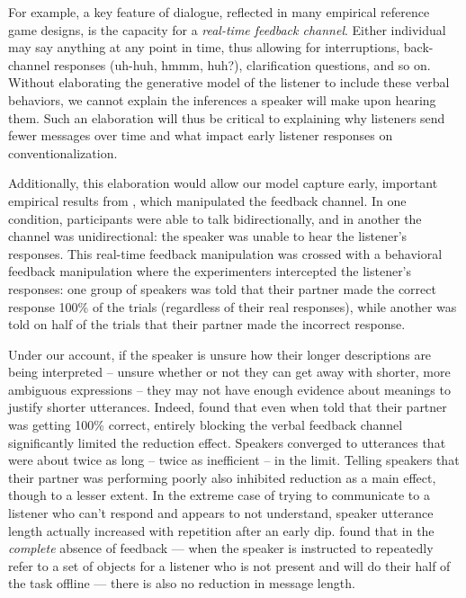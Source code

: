 For example, a key feature of dialogue, reflected in many empirical reference game designs, is the capacity for a \emph{real-time feedback channel}.
Either individual may say anything at any point in time, thus allowing for interruptions, back-channel responses (uh-huh, hmmm, huh?), clarification questions, and so on. 
Without elaborating the generative model of the listener to include these verbal behaviors, we cannot explain the inferences a speaker will make upon hearing them.
Such an elaboration will thus be critical to explaining why listeners send fewer messages over time and what impact early listener responses on conventionalization. 

Additionally, this elaboration would allow our model capture early, important empirical results from , which manipulated the feedback channel.
In one condition, participants were able to talk bidirectionally, and in another the channel was unidirectional: the speaker was unable to hear the listener's responses. 
This real-time feedback manipulation was crossed with a behavioral feedback manipulation where the experimenters intercepted the listener's responses: one group of speakers was told that their partner made the correct response 100\% of the trials (regardless of their real responses), while another was told on half of the trials that their partner made the incorrect response. 

Under our account, if the speaker is unsure how their longer descriptions are being interpreted -- unsure whether or not they can get away with shorter, more ambiguous expressions -- they may not have enough evidence about meanings to justify shorter utterances. 
Indeed,  found that even when told that their partner was getting 100\% correct, entirely blocking the verbal feedback channel significantly limited the reduction effect. 
Speakers converged to utterances that were about twice as long -- twice as inefficient -- in the limit. 
Telling speakers that their partner was performing poorly also inhibited reduction as a main effect, though to a lesser extent. 
In the extreme case of trying to communicate to a listener who can't respond and appears to not understand, speaker utterance length actually increased with repetition after an early dip. 
 found that in the \emph{complete} absence of feedback --- when the speaker is instructed to repeatedly refer to a set of objects for a listener who is not present and will do their half of the task offline --- there is also no reduction in message length. 

